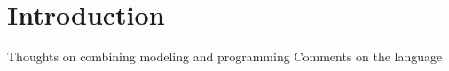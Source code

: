 
\section{Introduction}

\uml{} \cite{booch-uml-99}

Thoughts on combining modeling and programming 
  Comments on the \raiselang{} language \cite{havelund-losl-08}